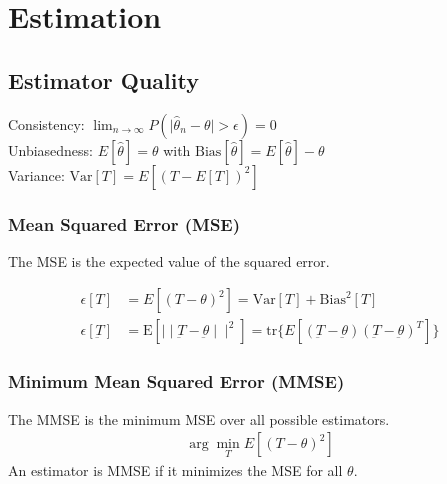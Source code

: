 \section{Estimation}
\begin{mdframed}[style=eqbox]
  \subsection{Estimator Quality}
  Consistency: $\lim_{n \rightarrow \infty} P(\mid \hat{\theta}_n - \theta \mid > \epsilon) = 0$\\
  Unbiasedness: $E[\hat{\theta}] = \theta$ with $\text{Bias}[\hat{\theta}] = E[\hat{\theta}] - \theta$\\
  Variance: $\text{Var}[T] = E[(T - E[T])^2]$
  \subsubsection{Mean Squared Error (MSE)}
  The MSE is the expected value of the squared error.
  \begin{mdframed}[style=redbox]
    \vspace*{-10pt}
    \begin{align*}
      \epsilon[T] &= E[(T - \theta)^2] = \text{Var}[T] + \text{Bias}^2[T]\\
      \epsilon[\underbar{T}] &= \text{E}[\mid\mid \underbar{T} - \underbar{\theta} \mid\mid^2] = \text{tr}\{E[(\underbar{T} - \underbar{\theta})(\underbar{T} - \underbar{\theta})^T]\}
    \end{align*}
  \end{mdframed}
  \subsubsection{Minimum Mean Squared Error (MMSE)}
  The MMSE is the minimum MSE over all possible estimators.
  \begin{align*}
    \arg \min_T E[(T - \theta)^2]
  \end{align*}
  An estimator is MMSE if it minimizes the MSE for all $\theta$.
\end{mdframed}

